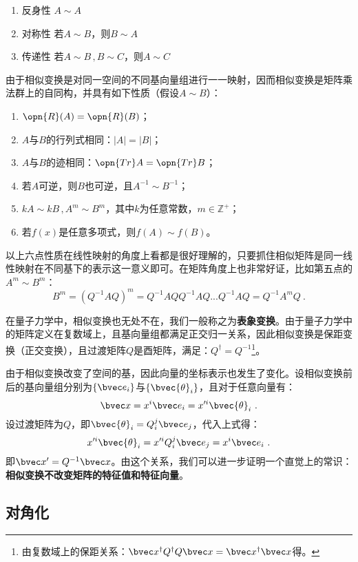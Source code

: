 \begin{enumerate}
\item 反身性 $A\sim A$ 
\item 对称性 若$A\sim B$，则$B\sim A$
\item 传递性 若$A\sim B\,,B\sim C$，则$A\sim C$
\end{enumerate}
由于相似变换是对同一空间的不同基向量组进行一一映射，因而相似变换是矩阵乘法群上的自同构，并具有如下性质（假设$A\sim B$）：
\begin{enumerate}
\item $\opn{R}(A)=\opn{R}(B)$；
\item $A$与$B$的行列式相同：$|A|=|B|$；
\item $A$与$B$的迹相同：$\opn{Tr}A=\opn{Tr}B$；
\item 若$A$可逆，则$B$也可逆，且$A^{-1}\sim B^{-1}$；
\item $kA\sim kB\,,A^m\sim B^m$，其中$k$为任意常数，$m\in \mathbb Z^{+}$；
\item 若$f(x)$是任意多项式，则$f(A)\sim f(B)$。
\end{enumerate}
以上六点性质在线性映射的角度上看都是很好理解的，只要抓住相似矩阵是同一线性映射在不同基下的表示这一意义即可。在矩阵角度上也非常好证，比如第五点的$A^m\sim B^m$：\begin{equation}
B^m=(Q^{-1}AQ)^m=Q^{-1}AQQ^{-1}AQ...Q^{-1}AQ=Q^{-1}A^mQ~.
\end{equation}

在量子力学中，相似变换也无处不在，我们一般称之为\textbf{表象变换}。由于量子力学中的矩阵定义在复数域上，且基向量组都满足正交归一关系，因此相似变换是保距变换（正交变换），且过渡矩阵$Q$是酉矩阵，满足：$Q^{\dagger}=Q^{-1}$\footnote{由复数域上的保距关系：$\bvec x^{\dagger}Q^{\dagger}Q\bvec x=\bvec x^{\dagger}\bvec x$得。}。

由于相似变换改变了空间的基，因此向量的坐标表示也发生了变化。设相似变换前后的基向量组分别为$\{\bvec e_i\}$与$\{\bvec {\theta}_i\}$，且对于任意向量有：
\begin{equation}
\bvec x=x^i\bvec e_i=x'^i\bvec {\theta}_i~.
\end{equation}
设过渡矩阵为$Q$，即$\bvec{\theta}_i=Q^j_i\bvec e_j$，代入上式得：
\begin{equation}
x'^i\bvec {\theta}_i=x'^iQ^j_i\bvec e_j=x^i\bvec e_i~.
\end{equation}
即$\bvec x'=Q^{-1}\bvec x$。由这个关系，我们可以进一步证明一个直觉上的常识：\textbf{相似变换不改变矩阵的特征值和特征向量}。
\subsection{对角化}

